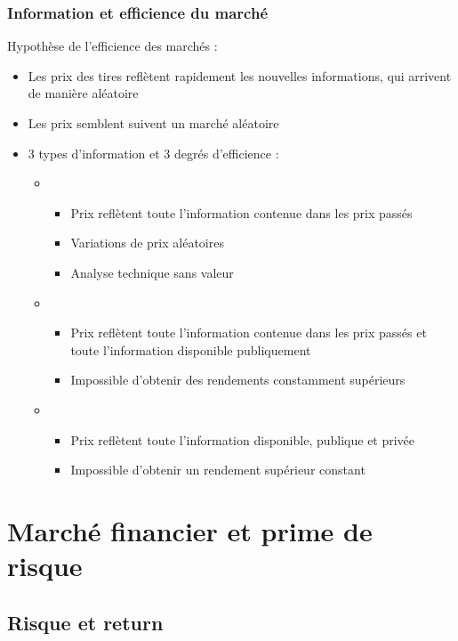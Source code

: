 \newpage
\subsection{Information et efficience du marché}

Hypothèse de l'efficience des marchés :
\begin{itemize}
    \item Les prix des tires reflètent rapidement les nouvelles informations, qui arrivent de manière aléatoire
    \item Les prix semblent suivent un marché aléatoire
    \item 3 types d'information et 3 degrés d'efficience :
    \begin{itemize}
        \item {}
        \begin{itemize}
            \item Prix reflètent toute l'information contenue dans les prix passés
            \item Variations de prix aléatoires
            \item Analyse technique sans valeur
        \end{itemize}
        \item {}
        \begin{itemize}
            \item Prix reflètent toute l'information contenue dans les prix passés et toute l'information disponible publiquement
            \item Impossible d'obtenir des rendements constamment supérieurs
        \end{itemize}
        \item {}
        \begin{itemize}
            \item Prix reflètent toute l'information disponible, publique et privée
            \item Impossible d'obtenir un rendement supérieur constant
        \end{itemize}
    \end{itemize}
\end{itemize}

\chapter{Marché financier et prime de risque}

\section{Risque et return}

